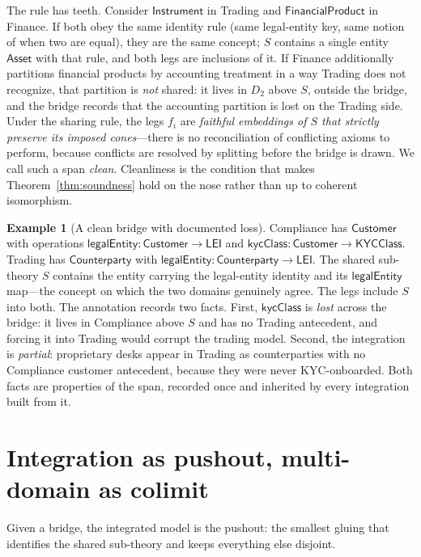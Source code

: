 \documentclass[11pt]{article}
\theoremstyle{plain}
\theoremstyle{definition}
\newtheorem{example}{Example}
\newcommand{\Inst}{\mathsf{Instrument}}
\newcommand{\FinProd}{\mathsf{FinancialProduct}}
\newcommand{\Cpty}{\mathsf{Counterparty}}
\newcommand{\Cust}{\mathsf{Customer}}
\begin{document}
The rule has teeth. Consider $\Inst$ in Trading and $\FinProd$ in Finance. If both obey the same identity rule (same legal-entity key, same notion of when two are equal), they are the same concept; $S$ contains a single entity $\mathsf{Asset}$ with that rule, and both legs are inclusions of it. If Finance additionally partitions financial products by accounting treatment in a way Trading does not recognize, that partition is \emph{not} shared: it lives in $D_2$ above $S$, outside the bridge, and the bridge records that the accounting partition is lost on the Trading side. Under the sharing rule, the legs $f_i$ are \emph{faithful embeddings of $S$ that strictly preserve its imposed cones}---there is no reconciliation of conflicting axioms to perform, because conflicts are resolved by splitting before the bridge is drawn. We call such a span \emph{clean}. Cleanliness is the condition that makes Theorem~\ref{thm:soundness} hold on the nose rather than up to coherent isomorphism.

\begin{example}[A clean bridge with documented loss]\label{ex:bridge}
Compliance has $\Cust$ with operations $\mathsf{legalEntity}\colon\Cust\to\mathsf{LEI}$ and $\mathsf{kycClass}\colon\Cust\to\mathsf{KYCClass}$. Trading has $\Cpty$ with $\mathsf{legalEntity}\colon\Cpty\to\mathsf{LEI}$. The shared sub-theory $S$ contains the entity carrying the legal-entity identity and its $\mathsf{legalEntity}$ map---the concept on which the two domains genuinely agree. The legs include $S$ into both. The annotation records two facts. First, $\mathsf{kycClass}$ is \emph{lost} across the bridge: it lives in Compliance above $S$ and has no Trading antecedent, and forcing it into Trading would corrupt the trading model. Second, the integration is \emph{partial}: proprietary desks appear in Trading as counterparties with no Compliance customer antecedent, because they were never KYC-onboarded. Both facts are properties of the span, recorded once and inherited by every integration built from it.
\end{example}

\section{Integration as pushout, multi-domain as colimit}\label{sec:pushout}

Given a bridge, the integrated model is the pushout: the smallest gluing that identifies the shared sub-theory and keeps everything else disjoint.
\end{document}
